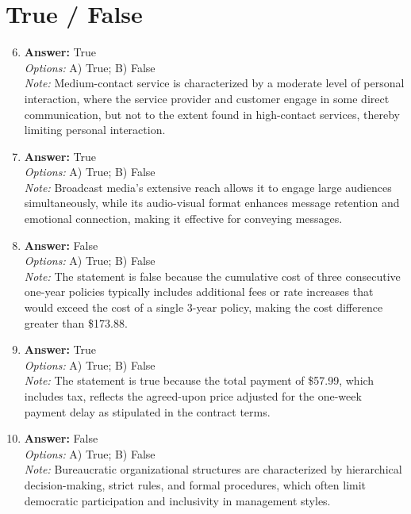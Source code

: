 \documentclass[12pt]{article}
\begin{document}
\section*{True / False}
\begin{enumerate}[label=\arabic*.]
\setcounter{enumi}{5}
\item \textbf{Answer:} True
\\ \textit{Options:} A) True; B) False
\\ \textit{Note:} Medium-contact service is characterized by a moderate level of personal interaction, where the service provider and customer engage in some direct communication, but not to the extent found in high-contact services, thereby limiting personal interaction.
\item \textbf{Answer:} True
\\ \textit{Options:} A) True; B) False
\\ \textit{Note:} Broadcast media's extensive reach allows it to engage large audiences simultaneously, while its audio-visual format enhances message retention and emotional connection, making it effective for conveying messages.
\item \textbf{Answer:} False
\\ \textit{Options:} A) True; B) False
\\ \textit{Note:} The statement is false because the cumulative cost of three consecutive one-year policies typically includes additional fees or rate increases that would exceed the cost of a single 3-year policy, making the cost difference greater than \$173.88.
\item \textbf{Answer:} True
\\ \textit{Options:} A) True; B) False
\\ \textit{Note:} The statement is true because the total payment of \$57.99, which includes tax, reflects the agreed-upon price adjusted for the one-week payment delay as stipulated in the contract terms.
\item \textbf{Answer:} False
\\ \textit{Options:} A) True; B) False
\\ \textit{Note:} Bureaucratic organizational structures are characterized by hierarchical decision-making, strict rules, and formal procedures, which often limit democratic participation and inclusivity in management styles.
\end{enumerate}
\end{document}
